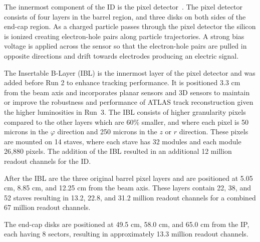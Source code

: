The innermost component of the ID is the pixel detector~\cite{pixel_detector_2008, pixel_detector_ibl}. The pixel detector consists of four layers in the barrel region, and three disks on both sides of the end-cap region\@. As a charged particle passes through the pixel detector the silicon is ionized creating electron-hole pairs along particle trajectories. A strong bias voltage is applied across the sensor so that the electron-hole pairs are pulled in opposite directions and drift towards electrodes producing an electric signal. 

The Insertable B-Layer (IBL) is the innermost layer of the pixel detector and was added before Run 2 to enhance tracking performance. It is positioned 3.3 cm from the beam axis and incorporates planar sensors and 3D sensors to maintain or improve the robustness and performance of ATLAS track reconstruction given the higher luminosities in Run~3. The IBL consists of higher granularity pixels compared to the other layers which are 60\% smaller, and where each pixel is 50 microns in the $\varphi$ direction and 250 microns in the $z$ or $r$ direction. These pixels are mounted on 14 staves, where each stave has 32 modules and each module 26,880 pixels. The addition of the IBL resulted in an additional 12 million readout channels for the ID\@.

After the IBL are the three original barrel pixel layers and are positioned at 5.05 cm, 8.85 cm, and 12.25 cm from the beam axis. These layers contain 22, 38, and 52 staves resulting in 13.2, 22.8, and 31.2 million readout channels for a combined 67 million readout channels.

The end-cap disks are positioned at 49.5 cm, 58.0 cm, and 65.0 cm from the IP, each having 8 sectors, resulting in approximately 13.3 million readout channels.


